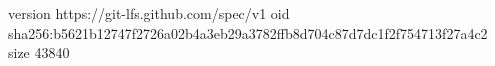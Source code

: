 version https://git-lfs.github.com/spec/v1
oid sha256:b5621b12747f2726a02b4a3eb29a3782ffb8d704c87d7dc1f2f754713f27a4c2
size 43840
